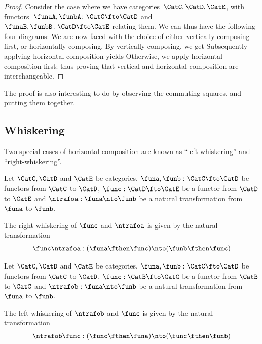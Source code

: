\begin{proof}
    Consider the case where we have categories~$\CatC, \CatD, \CatE$, with functors~$\funaA, \funbA\colon\CatC \fto \CatD$ and~$\funaB, \funbB\colon\CatD \fto \CatE$ relating them.
    We can thus have the following four diagrams:
    We are now faced with the choice of either vertically composing first, or horizontally composing.
    By vertically composing, we get
    Subsequently applying horizontal composition yields
    Otherwise, we apply horizontal composition first:
    thus proving that vertical and horizontal composition are interchangeable.
\end{proof}

\begin{remark}
    The proof is also interesting to do by observing the commuting squares, and putting them together.
\end{remark}
\subsection{Whiskering}
Two special cases of horizontal composition are known as ``left-whiskering'' and ``right-whiskering''.

\begin{ctdefinition}\label{def:right-whiskering}
    Let $\CatC, \CatD$ and $\CatE$ be categories, $\funa, \funb: \CatC \fto \CatD$ be functors from $\CatC$ to $\CatD$, $\func:\CatD \fto \CatE$ be a functor
    from $\CatD$ to $\CatE$ and $\ntrafoa:\funa \nto \funb$ be a natural transformation from $\funa$ to $\funb$.

    The right whiskering of $\func$ and $\ntrafoa$ is given by the natural transformation
    \begin{equation}
        \func \ntrafoa : (\funa\fthen\func) \nto (\funb\fthen\func)
    \end{equation}
\end{ctdefinition}

\begin{ctdefinition}\label{def:left-whiskering}
    Let $\CatC, \CatD$ and $\CatE$ be categories, $\funa, \funb: \CatC \fto \CatD$ be functors from $\CatC$ to $\CatD$, $\func:\CatB \fto \CatC$ be a functor
    from $\CatB$ to $\CatC$ and $\ntrafob:\funa \nto \funb$ be a natural transformation from $\funa$ to $\funb$.

    The left whiskering of $\ntrafob$ and $\func$ is given by the natural transformation
    \begin{equation}
        \ntrafob \func: (\func\fthen\funa) \nto (\func\fthen\funb)
    \end{equation}
\end{ctdefinition}


